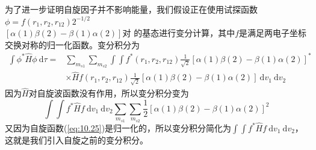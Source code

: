     为了进一步证明自旋因子并不影响能量，我们假设正在使用试探函数$\phi = f\left(r_1, r_2, r_{12}\right)2^{-1/2}$\\$ \left[\alpha\left(1\right)\beta\left(2\right) - \beta\left(1\right)\alpha\left(2\right)\right]$对  的基态进行变分计算，其中$f$是满足两电子坐标交换对称的归一化函数。变分积分为
    \begin{equation*}
        \begin{aligned}
            \int \phi^* \hat{H} \phi \: \mathrm{d}\tau =& \sum_{m_{s1}} \sum_{m_{s2}} \int \int f^* \left(r_1, r_2, r_{12}\right) \frac{1}{\sqrt{2}} \left[\alpha\left(1\right)\beta\left(2\right) - \beta\left(1\right)\alpha\left(2\right)\right]^* \\
            & \times \hat{H} f \left(r_1, r_2, r_{12}\right) \frac{1}{\sqrt{2}} \left[\alpha\left(1\right)\beta\left(2\right) - \beta\left(1\right)\alpha\left(2\right)\right] \: \mathrm{d}v_1 \: \mathrm{d}v_2
        \end{aligned}
    \end{equation*}
    因为$\hat{H}$对自旋波函数没有作用，所以变分积分变为
    \begin{equation*}
        \int \int f^* \hat{H} f \:\mathrm{d} v_1 \: \mathrm{d} v_2 \sum_{m_{s1}} \sum_{m_{s2}} \frac{1}{2} \left[\alpha\left(1\right)\beta\left(2\right) - \beta\left(1\right)\alpha\left(2\right)\right]^2
    \end{equation*}
    又因为自旋函数(\ref{eq:10.25})是归一化的，所以变分积分简化为$\int \int f^* \hat{H} f \:\mathrm{d} v_1 \: \mathrm{d} v_2$，这就是我们引入自旋之前的变分积分。

